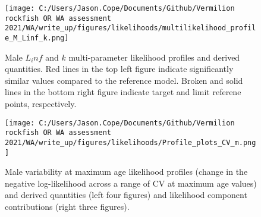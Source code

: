 \documentclass[11pt,
  english,
  a4paper,
]{article}
\begin{document}
\tagmcend\tagstructend


\begin{figure}
\centering
\texttt{[image: C:/Users/Jason.Cope/Documents/Github/Vermilion rockfish OR WA assessment 2021/WA/write\_up/figures/likelihoods/multilikelihood\_profile\_M\_Linf\_k.png]}
\caption{Male {\(L_inf\)\leavevmode\tagmcend\tagstructend} and {\(k\)\leavevmode\tagmcend\tagstructend} multi-parameter likelihood profiles and derived quantities. Red lines in the top left figure indicate significantly similar values compared to the reference model. Broken and solid lines in the bottom right figure indicate target and limit referene points, respectively.\label{fig:Linf_k_m-profile}}
\end{figure}

\tagmcend\tagstructend


\begin{figure}
\centering
\texttt{[image: C:/Users/Jason.Cope/Documents/Github/Vermilion rockfish OR WA assessment 2021/WA/write\_up/figures/likelihoods/Profile\_plots\_CV\_m.png]}
\caption{Male variability at maximum age likelihood profiles (change in the negative log-likelihood across a range of CV at maximum age values) and derived quantities (left four figures) and likelihood component contributions (right three figures).\label{fig:CVold_m-profile-combo}}
\end{figure}

\tagmcend\tagstructend

\end{document}
